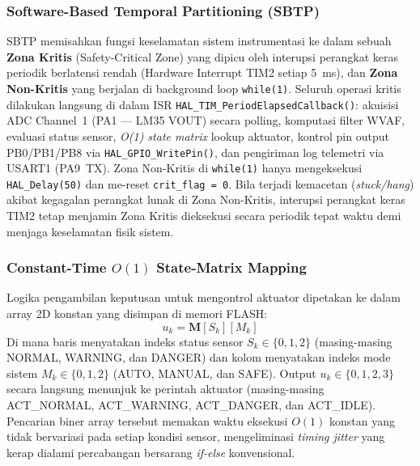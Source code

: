 \documentclass[11pt,a4paper]{article}
\begin{document}
\begin{longtable}
\subsubsection{Software-Based Temporal Partitioning (SBTP)}
\hspace{1.5em}SBTP memisahkan fungsi keselamatan sistem instrumentasi ke dalam sebuah \textbf{Zona Kritis} (Safety-Critical Zone) yang dipicu oleh interupsi perangkat keras periodik berlatensi rendah (Hardware Interrupt TIM2 setiap 5~ms), dan \textbf{Zona Non-Kritis} yang berjalan di background loop \texttt{while(1)}. Seluruh operasi kritis dilakukan langsung di dalam ISR \texttt{HAL\_TIM\_PeriodElapsedCallback()}: akuisisi ADC Channel~1 (PA1 --- LM35 VOUT) secara polling, komputasi filter WVAF, evaluasi status sensor, \textit{O(1) state matrix} lookup aktuator, kontrol pin output PB0/PB1/PB8 via \texttt{HAL\_GPIO\_WritePin()}, dan pengiriman log telemetri via USART1 (PA9~TX). Zona Non-Kritis di \texttt{while(1)} hanya mengeksekusi \texttt{HAL\_Delay(50)} dan me-reset \texttt{crit\_flag = 0}. Bila terjadi kemacetan (\textit{stuck/hang}) akibat kegagalan perangkat lunak di Zona Non-Kritis, interupsi perangkat keras TIM2 tetap menjamin Zona Kritis dieksekusi secara periodik tepat waktu demi menjaga keselamatan fisik sistem.

\subsubsection{Constant-Time $O(1)$ State-Matrix Mapping}
\hspace{1.5em}Logika pengambilan keputusan untuk mengontrol aktuator dipetakan ke dalam array 2D konstan yang disimpan di memori FLASH:
\begin{equation}
u_k = \mathbf{M}[S_k][M_k]
\end{equation}
\hspace{1.5em}Di mana baris menyatakan indeks status sensor $S_k \in \{0, 1, 2\}$ (masing-masing NORMAL, WARNING, dan DANGER) dan kolom menyatakan indeks mode sistem $M_k \in \{0, 1, 2\}$ (AUTO, MANUAL, dan SAFE). Output $u_k \in \{0, 1, 2, 3\}$ secara langsung menunjuk ke perintah aktuator (masing-masing ACT\_NORMAL, ACT\_WARNING, ACT\_DANGER, dan ACT\_IDLE). Pencarian biner array tersebut memakan waktu eksekusi $O(1)$ konstan yang tidak bervariasi pada setiap kondisi sensor, mengeliminasi \textit{timing jitter} yang kerap dialami percabangan bersarang \textit{if-else} konvensional.


\end{longtable}
\end{document}
